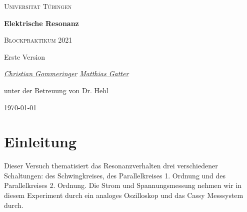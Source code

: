 \documentclass[a4paper, 12pt,]{scrartcl}
\begin{document}
\begin{titlepage}
	\centering
	{\scshape\LARGE Universität Tübingen \par}
	\vspace{2cm}
	{\huge\bfseries Elektrische Resonanz \par}
	\vspace{2cm}
	{\Large \scshape Blockpraktikum 2021} \par
	\vspace{2cm}
	{\Large  Erste Version} \par
	\vspace{2cm}
	{\Large\itshape \underline{Christian Gommeringer} \space \space  \underline{Matthias Gatter}\par}
	\vfill 
	{\large unter der Betreuung von Dr. Hehl}
	\vfill

	{\large \today\par}
\end{titlepage}
\newpage 
\tableofcontents 

\newpage
\section{Einleitung}
\begin{flushleft}
Dieser Versuch thematisiert das Resonanzverhalten drei verschiedener Schaltungen: des Schwingkreises, des Parallelkreises 1. Ordnung und des Parallelkreises 2. Ordnung. Die Strom und Spannungsmessung nehmen wir in diesem Experiment durch ein analoges Oszilloskop und das Cassy Messsystem durch.

\end{flushleft}
\end{document}
